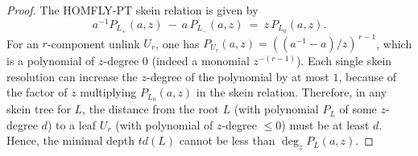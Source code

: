 \documentclass[10pt,a4paper]{amsart}
\begin{document}
	\begin{proof}
		The HOMFLY-PT skein relation is given by 
		\[a^{-1} P_{L_+}(a,z)\ -\ a\,P_{L_-}(a,z)\ =\ z\,P_{L_0}(a,z).\] 
		For an $r$-component unlink $U_r$, one has $P_{U_r}(a,z) = ((a^{-1}-a)/z)^{\,r-1}$, which is a polynomial of $z$-degree $0$ (indeed a monomial $z^{-(r-1)}$). Each single skein resolution can increase the $z$-degree of the polynomial by at most $1$, because of the factor of $z$ multiplying $P_{L_0}(a,z)$ in the skein relation. Therefore, in any skein tree for $L$, the distance from the root $L$ (with polynomial $P_L$ of some $z$-degree $d$) to a leaf $U_r$ (with polynomial of $z$-degree $\le 0$) must be at least $d$. Hence, the minimal depth $td(L)$ cannot be less than $\deg_z P_L(a,z)$.
	\end{proof}
\end{document}
